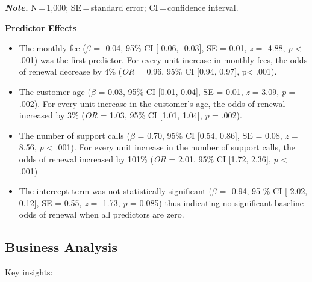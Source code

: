 \documentclass[
]{article}
\begin{document}
\textbf{\emph{Note.}} N\,=\,1,000; SE\,=\,standard error;
CI\,=\,confidence interval.

\textbf{Predictor Effects}

\begin{itemize}
\item
  The monthly fee (\(\beta\) = -0.04, 95\% CI {[}-0.06, -0.03{]}, SE =
  0.01, \emph{z} = -4.88, \emph{p} \textless{} .001) was the first
  predictor. For every unit increase in monthly fees, the odds of
  renewal decrease by 4\% (\emph{OR} = 0.96, 95\% CI {[}0.94, 0.97{]},
  p\textless{} .001).
\item
  The customer age (\(\beta\) = 0.03, 95\% CI {[}0.01, 0.04{]}, SE =
  0.01, \emph{z} = 3.09, \emph{p} = .002). For every unit increase in
  the customer's age, the odds of renewal increased by 3\% (\emph{OR} =
  1.03, 95\% CI {[}1.01, 1.04{]}, \emph{p} = .002).
\item
  The number of support calls (\(\beta\) = 0.70, 95\% CI {[}0.54,
  0.86{]}, SE = 0.08, \emph{z} = 8.56, \emph{p} \textless{} .001). For
  every unit increase in the number of support calls, the odds of
  renewal increased by 101\% (\emph{OR} = 2.01, 95\% CI {[}1.72,
  2.36{]}, \emph{p} \textless{} .001)
\item
  The intercept term was not statistically significant (\(\beta\) =
  -0.94, 95 \% CI {[}-2.02, 0.12{]}, SE = 0.55, \emph{z} = -1.73,
  \emph{p} = 0.085) thus indicating no significant baseline odds of
  renewal when all predictors are zero.
\end{itemize}

\subsection{Business Analysis}\label{business-analysis}

Key insights:
\end{document}
